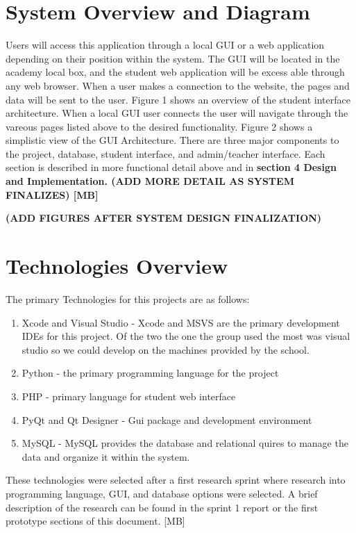 \section{System Overview and Diagram}
\textmd{Users will access this application through a local GUI or a web application depending on their position within the system. The GUI will be located in the academy local box, and the student web application will be excess able through any web browser.
When a user makes a connection to the website, the pages and data will be sent to the user. Figure 1 shows an overview of the student interface architecture.
When a local GUI user connects the user will navigate through the vareous pages listed above to the desired functionality. Figure 2 shows a simplistic view of the GUI Architecture.
There are three major components to the project, database, student interface, and admin/teacher interface.  Each section is described in more functional detail above and in} \bf section 4 Design and Implementation.
\bf (ADD MORE DETAIL AS SYSTEM FINALIZES) [MB]


\bf(ADD FIGURES AFTER SYSTEM DESIGN FINALIZATION)


\section{Technologies Overview}
\textmd{The primary Technologies for this projects are as follows:}

\begin{enumerate}
\item Xcode and Visual Studio - Xcode and MSVS are the primary development IDEs for this project. Of the two the one the group used the most was visual studio so we could develop on the machines provided by the school.
\item Python - the primary programming language for the project
\item PHP - primary language for student web interface
\item PyQt and Qt Designer - Gui package and development environment 
\item MySQL - MySQL provides the database and relational quires to manage the data and organize it within the system.
\end{enumerate}


\textmd{These technologies were selected after a first research sprint where research into programming language, GUI, and database options were selected. A brief description of the research can be found in the sprint 1 report or the first prototype sections of this document. [MB]}